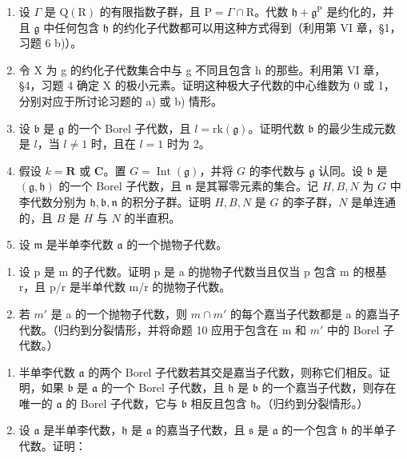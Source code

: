 
\begin{enumerate}
\def\labelenumi{\arabic{enumi})}
\item
  设 \(\Gamma\) 是 \(\mathrm{Q}(\mathrm{R})\) 的有限指数子群，且 \(\mathrm{P} = \Gamma \cap \mathrm{R}\)。代数 \(\mathfrak{h} + \mathfrak{g}^{\mathrm{P}}\) 是约化的，并且 \(\mathfrak{g}\) 中任何包含 \(\mathfrak{h}\) 的约化子代数都可以用这种方式得到（利用第 VI 章，§1，习题 6 b)）。
\item
  令 X 为 g 的约化子代数集合中与 g 不同且包含 h 的那些。利用第 VI 章，§4，习题 4 确定 X 的极小元素。证明这种极大子代数的中心维数为 0 或 1，分别对应于所讨论习题的 a) 或 b) 情形。
\item
  设 \(\mathfrak{b}\) 是 \(\mathfrak{g}\) 的一个 Borel 子代数，且 \(l = \mathrm{rk}(\mathfrak{g})\)。证明代数 \(\mathfrak{b}\) 的最少生成元数是 \(l\)，当 \(l \neq 1\) 时，且在 \(l = 1\) 时为 2。
\item
  假设 \(k = \mathbf{R}\) 或 \(\mathbf{C}\)。置 \(G = \operatorname{Int}(\mathfrak{g})\)，并将 \(G\) 的李代数与 \(\mathfrak{g}\) 认同。设 \(\mathfrak{b}\) 是 \((\mathfrak{g},\mathfrak{h})\) 的一个 Borel 子代数，且 \(\mathfrak{n}\) 是其幂零元素的集合。记 \(H,B,N\) 为 \(G\) 中李代数分别为 \(\mathfrak{h},\mathfrak{b},\mathfrak{n}\) 的积分子群。证明 \(H,B,N\) 是 \(G\) 的李子群，\(N\) 是单连通的，且 \(B\) 是 \(H\) 与 \(N\) 的半直积。
\item
  设 \(\mathfrak{m}\) 是半单李代数 \(\mathfrak{a}\) 的一个抛物子代数。
\end{enumerate}

\begin{enumerate}
\def\labelenumi{\alph{enumi})}
\item
  设 p 是 m 的子代数。证明 p 是 a 的抛物子代数当且仅当 p 包含 m 的根基 r，且 p/r 是半单代数 m/r 的抛物子代数。
\item
  若 \(m'\) 是 a 的一个抛物子代数，则 \(m \cap m'\) 的每个嘉当子代数都是 a 的嘉当子代数。（归约到分裂情形，并将命题 10 应用于包含在 m 和 \(m'\) 中的 Borel 子代数。）
\end{enumerate}

\begin{enumerate}
\def\labelenumi{\arabic{enumi})}
\setcounter{enumi}{5}
\item
  半单李代数 \(\mathfrak{a}\) 的两个 Borel 子代数若其交是嘉当子代数，则称它们相反。证明，如果 \(\mathfrak{b}\) 是 \(\mathfrak{a}\) 的一个 Borel 子代数，且 \(\mathfrak{h}\) 是 \(\mathfrak{b}\) 的一个嘉当子代数，则存在唯一的 \(\mathfrak{a}\) 的 Borel 子代数，它与 \(\mathfrak{b}\) 相反且包含 \(\mathfrak{h}\)。（归约到分裂情形。）
\item
  设 \(\mathfrak{a}\) 是半单李代数，\(\mathfrak{h}\) 是 \(\mathfrak{a}\) 的嘉当子代数，且 \(\mathfrak{s}\) 是 \(\mathfrak{a}\) 的一个包含 \(\mathfrak{h}\) 的半单子代数。证明：
\end{enumerate}


